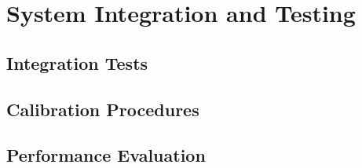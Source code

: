 \chapter{System Integration and Testing}

\setcounter{section}{0}
\setcounter{subsection}{0}

\section{Integration Tests}

\section{Calibration Procedures}

\section{Performance Evaluation}


